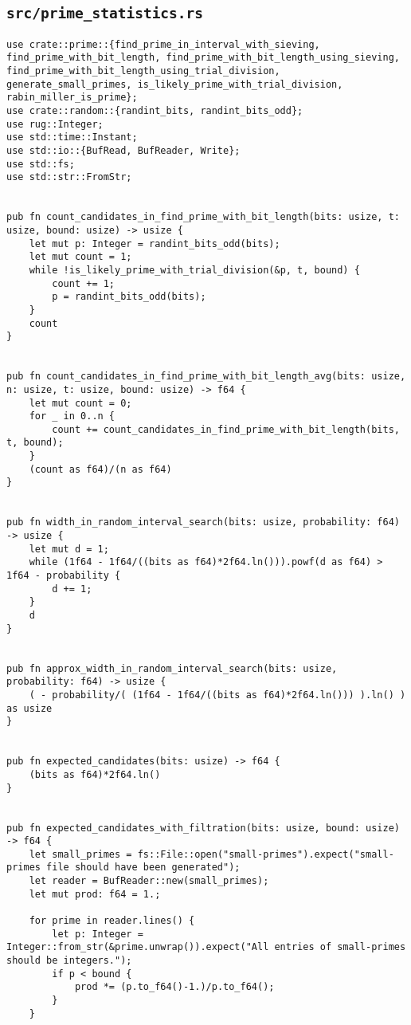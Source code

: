 \subsection{\texttt{src/prime_statistics.rs}}
\begin{verbatim}
use crate::prime::{find_prime_in_interval_with_sieving, find_prime_with_bit_length, find_prime_with_bit_length_using_sieving, find_prime_with_bit_length_using_trial_division, generate_small_primes, is_likely_prime_with_trial_division, rabin_miller_is_prime};
use crate::random::{randint_bits, randint_bits_odd};
use rug::Integer;
use std::time::Instant;
use std::io::{BufRead, BufReader, Write};
use std::fs;
use std::str::FromStr;


pub fn count_candidates_in_find_prime_with_bit_length(bits: usize, t: usize, bound: usize) -> usize {
    let mut p: Integer = randint_bits_odd(bits);
    let mut count = 1;
    while !is_likely_prime_with_trial_division(&p, t, bound) {
        count += 1;
        p = randint_bits_odd(bits);
    }
    count
}


pub fn count_candidates_in_find_prime_with_bit_length_avg(bits: usize, n: usize, t: usize, bound: usize) -> f64 {
    let mut count = 0;
    for _ in 0..n {
        count += count_candidates_in_find_prime_with_bit_length(bits, t, bound);
    }
    (count as f64)/(n as f64)
}


pub fn width_in_random_interval_search(bits: usize, probability: f64) -> usize {
    let mut d = 1;
    while (1f64 - 1f64/((bits as f64)*2f64.ln())).powf(d as f64) > 1f64 - probability {
        d += 1;
    }
    d
}


pub fn approx_width_in_random_interval_search(bits: usize, probability: f64) -> usize {
    ( - probability/( (1f64 - 1f64/((bits as f64)*2f64.ln())) ).ln() ) as usize
}


pub fn expected_candidates(bits: usize) -> f64 {
    (bits as f64)*2f64.ln()
}


pub fn expected_candidates_with_filtration(bits: usize, bound: usize) -> f64 {
    let small_primes = fs::File::open("small-primes").expect("small-primes file should have been generated");
    let reader = BufReader::new(small_primes);
    let mut prod: f64 = 1.;
    
    for prime in reader.lines() {
        let p: Integer = Integer::from_str(&prime.unwrap()).expect("All entries of small-primes should be integers.");
        if p < bound {
            prod *= (p.to_f64()-1.)/p.to_f64();
        }
    }


\end{verbatim}
